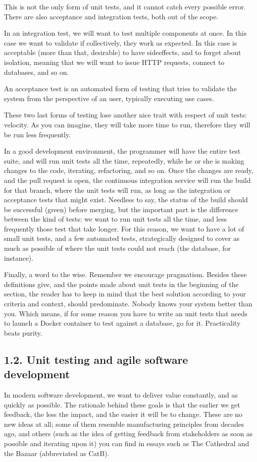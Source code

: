 \documentclass[a4paper,10pt,english]{sphinxmanual}
\begin{document}
This is not the only form of unit tests, and it cannot catch every possible error. There are
also acceptance and integration tests, both out of the scope.

In an integration test, we will want to test multiple components at once. In this case we
want to validate if collectively, they work as expected. In this case is acceptable (more than
that, desirable) to have side\sphinxhyphen{}effects, and to forget about isolation, meaning that we will
want to issue HTTP requests, connect to databases, and so on.

An acceptance test is an automated form of testing that tries to validate the system from the
perspective of an user, typically executing use cases.

These two last forms of testing lose another nice trait with respect of unit tests: velocity. As
you can imagine, they will take more time to run, therefore they will be run less frequently.

In a good development environment, the programmer will have the entire test suite, and
will run unit tests all the time, repeatedly, while he or she is making changes to the code,
iterating, refactoring, and so on. Once the changes are ready, and the pull request is open, the
continuous integration service will run the build for that branch, where the unit tests will
run, as long as the integration or acceptance tests that might exist. Needless to say, the
status of the build should be successful (green) before merging, but the important part is
the difference between the kind of tests: we want to run unit tests all the time, and less
frequently those test that take longer. For this reason, we want to have a lot of small unit
tests, and a few automated tests, strategically designed to cover as much as possible of
where the unit tests could not reach (the database, for instance).

Finally, a word to the wise. Remember we encourage pragmatism. Besides these
definitions give, and the points made about unit tests in the beginning of the section, the
reader has to keep in mind that the best solution according to your criteria and context,
should predominate. Nobody knows your system better than you. Which means, if for
some reason you have to write an unit tests that needs to launch a Docker container to test
against a database, go for it. Practicality beats purity.


\subsection{1.2. Unit testing and agile software development}
\label{\detokenize{chapters/8_unit_testing/index:unit-testing-and-agile-software-development}}
In modern software development, we want to deliver value constantly, and as quickly as
possible. The rationale behind these goals is that the earlier we get feedback, the less the
impact, and the easier it will be to change. These are no new ideas at all; some of them
resemble manufacturing principles from decades ago, and others (such as the idea of
getting feedback from stakeholders as soon as possible and iterating upon it) you can find
in essays such as The Cathedral and the Bazaar (abbreviated as CatB).
\end{document}
